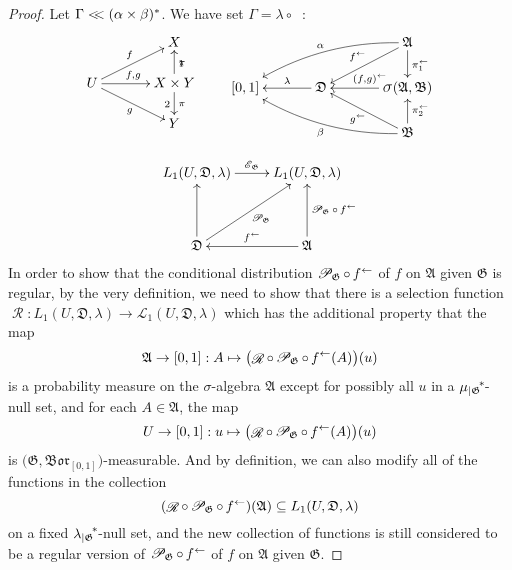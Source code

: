 \documentclass[
twoside=true,
paper=letter,
fontsize=9pt,
pagesize=auto,
leqno,
openany,
headsepline,
overfullrule,
]{scrbook}
\theoremstyle{plain}
\theoremstyle{plain}
\theoremstyle{definition}
\theoremstyle{bfnoteitalic}
\theoremstyle{bfnoteroman}
\newcommand{\sigalg}[1]{\mathfrak{#1}}
\newcommand{\cali}[1]{\mathscr{#1}}
\newcommand{\condexpop}[1]{\mathop{\cali{E}\hspace{-1pt}}\nolimits_{#1}}
\newcommand{\condprobop}[1]{\mathop{\cali{P}\hspace{-1pt}}\nolimits_{#1}}
\newcommand{\borel}{\mathfrak{Bor}}
\newcommand{\sagb}{\mathop{\hbox{\large{$\sigma$}}}\nolimits}
\newcommand{\textsigma}{\hbox{\large{$\sigma$}}\kern-1pt}
\newcommand{\restrictedto}[1]{_{\lvert#1}\kern-1.5pt}
\newcommand{\preimage}[1]{\mathop{#1^{\leftarrow}}}
\newcommand{\sigmaalgebra}{\sigalg{A}}
\newcommand{\sigmaalgebraii}{\sigalg{B}}
\newcommand{\productsig}[2]{\sagb(#1,#2)}
\newcommand{\kernast}{\ast\kern-1pt}
\newcommand{\funcf}{f}
\newcommand{\funcg}{g}
\newcommand{\function}{f}
\newcommand{\measurespace}{X}
\newcommand{\measurespaceii}{Y}
\newcommand{\abscont}{\mathrel{< \kern-3.5pt <}}
\newcommand{\measure}{\mu}
\newcommand{\measlambda}{\lambda}
\newcommand{\seti}{A}
\newcommand{\regular}{\mathop{\cali{R}}}
\newcommand{\projectionone}{\pi_1}
\newcommand{\projectiontwo}{\pi_2}
\newcommand{\uspace}{U}%
\newcommand{\uspaceelt}{u}
\newcommand{\uspacesig}{\sigalg{D}}
\newcommand{\joint}{\Gamma}%
\newcommand{\marginalone}{\alpha}%
\newcommand{\marginaltwo}{\beta}%
\begin{document}
\begin{proof}
Let $\joint \abscont (\marginalone\times\marginaltwo)^*$.
We have set
$\joint = \measlambda\circ\preimage{({\funcf,\funcg})}$:
\[
\xymatrix@R=16pt@C=34pt{
 & \measurespace
 \\
 \uspace
 \ar[ur]^{\funcf}
 \ar[dr]_{\funcg}
 \ar[r]^{\funcf, \funcg} &
 \measurespace \times \measurespaceii  \ar[u]_\projectionone \ar[d]^\projectiontwo
 \\
 & \measurespaceii  \\
}
\qquad
\xymatrix@R=18pt@C=34pt{
 & & \sigmaalgebra
 \ar[dl]_{\preimage{\funcf}}
 \ar[d]^{\preimage{\projectionone}}
 \ar@/_10pt/[lld]_{\marginalone}
 \\
 [0,1] & \uspacesig \ar[l]_-{\measlambda} &
 \productsig{\sigmaalgebra}{\sigmaalgebraii}
 \ar[l]_{\hskip8pt \preimage{(\funcf,\funcg)}}
 \\
 & & \sigmaalgebraii
  \ar[u]_{\preimage{\projectiontwo}}
  \ar[ul]^{\preimage{\funcg}}
  \ar@/^10pt/[llu]^{\marginaltwo}
  \\
}
\]


\[%
\xymatrix@R=16pt@C=24pt{
L_1(\uspace, \uspacesig, \measlambda) \ar[r]^{\condexpop{\sigalg{G}}}
& L_1(\uspace, \uspacesig, \measlambda)
\\
&
\\
\uspacesig \ar[uu] \ar[uur]_{ \condprobop{\sigalg{G}} }
& \sigmaalgebra
\ar[uu]_{ \condprobop{\sigalg{G}} \circ \preimage{\function} }
\ar[l]_{\preimage{\funcf}}
\\
}
\]
In order to show that the conditional distribution
$\condprobop{\sigalg{G}}\circ \preimage{\funcf}$ of $\funcf$ on $\sigmaalgebra$ given $\sigalg{G}$ is regular, by the very definition, we need to show that there is a selection function
$\regular:
L_1(\uspace,\uspacesig,\measlambda)
\to
\cali{L}_1(\uspace,\uspacesig,\measlambda) $
which has the additional property that the map
\[
\sigmaalgebra\to [0,1]: \seti \mapsto
\bigl( \regular\circ\condprobop{\sigalg{G}} \circ\preimage{\function}
(\seti)\bigr)(\uspaceelt)
\]
is a probability measure on the \textsigma\hyp{}algebra $\sigmaalgebra$ except for possibly all
$\uspaceelt$ in a
${\measure\restrictedto{\sigalg{G}}}^\kernast$-null set,
and for each
$\seti\in\sigmaalgebra$, the map
\[
\uspace\to [0,1] : \uspaceelt\mapsto
\bigl( \regular\circ\condprobop{\sigalg{G}}\circ\preimage{\function}
(\seti)\bigr)(\uspaceelt)
\]
is $\bigl(\sigalg{G}, \borel_{[0,1]}\bigr)$\hyp{}measurable.
And by definition, we can also modify all of the functions in the collection
\[
(\regular\circ\condprobop{\sigalg{G}}\circ\preimage{\function})
(\sigmaalgebra)
\subseteq
L_1(\uspace,\uspacesig,\measlambda)
\]
on a fixed
${ \measlambda\restrictedto{\sigalg{G}} }^\kernast$\hyp{}null set,
and the new collection of functions is still considered to be a
regular version of
$\condprobop{\sigalg{G}}\circ\preimage{\function}$
of $\function$
on $\sigmaalgebra$ given $\sigalg{G}$.


\end{proof}
\end{document}
